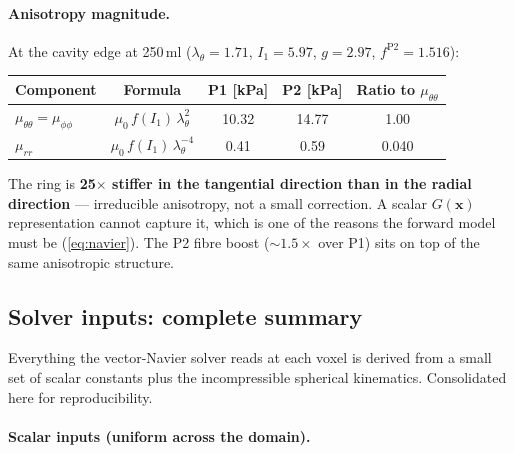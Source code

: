 \documentclass[11pt,letterpaper]{article}
\newcommand{\vect}[1]{\boldsymbol{#1}}
\begin{document}
\paragraph{Anisotropy magnitude.} At the cavity edge at
250\,\si{\milli\litre} ($\lambda_\theta = 1.71$, $I_1 = 5.97$,
$g = 2.97$, $f^{\text{P2}} = 1.516$):

\begin{center}
\begin{tabular}{lcccc}
\toprule
Component & Formula & P1 [\si{\kilo\pascal}] & P2 [\si{\kilo\pascal}] & Ratio to $\mu_{\theta\theta}$ \\
\midrule
$\mu_{\theta\theta} = \mu_{\phi\phi}$ & $\mu_0\,f(I_1)\,\lambda_\theta^{2}$    & 10.32 & 14.77 & 1.00 \\
$\mu_{rr}$                            & $\mu_0\,f(I_1)\,\lambda_\theta^{-4}$   & 0.41  & 0.59  & 0.040 \\
\bottomrule
\end{tabular}
\end{center}

The ring is \textbf{25$\times$ stiffer in the tangential direction
than in the radial direction} — irreducible anisotropy, not a small
correction. A scalar $G(\vect x)$ representation cannot capture it,
which is one of the reasons the forward model must be
(\ref{eq:navier}). The P2 fibre boost (${\sim}1.5\times$ over P1)
sits on top of the same anisotropic structure.

\subsection{Solver inputs: complete summary}
\label{sec:solver-inputs}

Everything the vector-Navier solver reads at each voxel is derived
from a small set of scalar constants plus the incompressible
spherical kinematics. Consolidated here for reproducibility.

\paragraph{Scalar inputs (uniform across the domain).}
\end{document}
